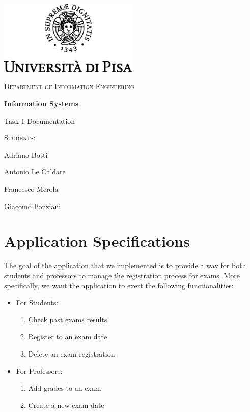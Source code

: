 \documentclass{report}
\begin{document}
	\begin{titlepage}
		\centering
		\includegraphics[width=0.5\textwidth]{unipi.png}\par\vspace{1cm}
		{\scshape\LARGE Department of Information Engineering \par}
		\vspace{1cm}
		{\huge\bfseries Information Systems \par Task 1 Documentation  \par}
		\vspace{2cm}
		\vfill
		{\Large\scshape Students: \par 
			Adriano Botti \par
			Antonio Le Caldare \par
			Francesco Merola \par 
			Giacomo Ponziani \par}
		\vfill
		
	\end{titlepage}
\tableofcontents
\newpage
\listoffigures

\chapter*{Application Specifications}
The goal of the application that we implemented is to provide a way for both students and professors to manage the registration process for exams. More specifically, we want the application to exert the following functionalities:
\begin{itemize}
	\item For Students:
	\begin{enumerate}
		\item Check past exams results
		\item Register to an exam date
		\item Delete an exam registration
	\end{enumerate}
	\item For Professors:
	\begin{enumerate}
		\item Add grades to an exam
		\item Create a new exam date
	\end{enumerate} 
\end{itemize}
\end{document}
